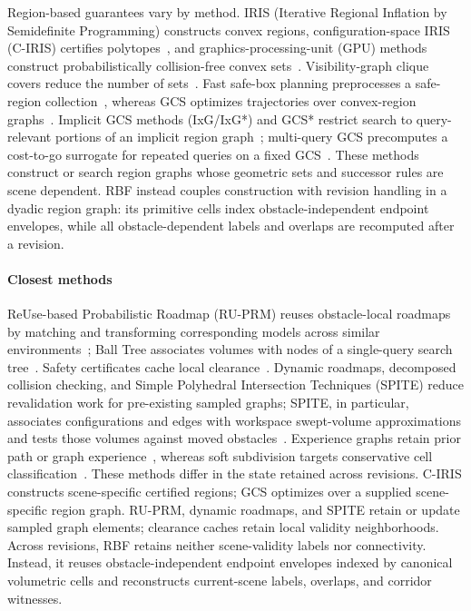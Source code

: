 \documentclass[journal]{IEEEtran}
\newcommand{\rbf}{RBF}
\begin{document}
Region-based guarantees vary by method. IRIS (Iterative Regional Inflation by
Semidefinite Programming) constructs convex regions, configuration-space IRIS
(C-IRIS) certifies polytopes~\cite{deits2015computing,dai2024certified}, and
graphics-processing-unit (GPU) methods construct probabilistically collision-free
convex sets~\cite{werner2025superfast,werner2026faster}. Visibility-graph clique
covers reduce the number of sets~\cite{werner2024approximating}. Fast safe-box
planning preprocesses a safe-region collection~\cite{marcucci2024fastboxes},
whereas GCS optimizes trajectories over convex-region
graphs~\cite{marcucci2023motion,marcucci2024shortest}. Implicit GCS methods
(IxG/IxG*) and GCS* restrict search to query-relevant portions of an implicit
region graph~\cite{natarajan2024ixg,chewchia2026gcsstar}; multi-query GCS
precomputes a cost-to-go surrogate for repeated queries on a fixed
  GCS~\cite{morozov2026multiquery}. These methods construct or search region
  graphs whose geometric sets and successor rules are scene dependent. \rbf{}
  instead couples construction with revision handling in a dyadic region graph:
  its primitive cells index
obstacle-independent endpoint envelopes, while all obstacle-dependent labels
and overlaps are recomputed after a revision.

\paragraph{Closest methods}
ReUse-based Probabilistic Roadmap (RU-PRM) reuses obstacle-local roadmaps by
matching and transforming corresponding models across similar
environments~\cite{lien2009reuse}; Ball Tree associates volumes with nodes of a
single-query search tree~\cite{shkolnik2011volumes}. Safety certificates cache
local clearance~\cite{bialkowski2016safety}. Dynamic roadmaps, decomposed
collision checking, and Simple Polyhedral Intersection Techniques (SPITE)
reduce revalidation work for pre-existing sampled graphs; SPITE, in particular,
associates configurations and edges with workspace swept-volume approximations
and tests those volumes against moved obstacles~\cite{leven2002framework,
hartmann2023decomposed,ashur2026spite}. Experience graphs retain prior path or
graph experience~\cite{coleman2015experience}, whereas soft subdivision targets
conservative cell classification~\cite{wang2015soft}. These methods differ in
the state retained across revisions. C-IRIS constructs scene-specific certified
regions; GCS optimizes over a supplied scene-specific region graph. RU-PRM,
dynamic roadmaps, and SPITE retain or update sampled graph elements; clearance
caches retain local validity neighborhoods.
Across revisions, \rbf{} retains neither scene-validity labels nor connectivity.
Instead, it reuses obstacle-independent endpoint envelopes indexed by canonical
volumetric cells and reconstructs current-scene labels, overlaps, and corridor
witnesses.
\end{document}
